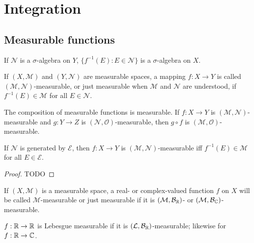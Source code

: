 \setchapterpreamble[u]{\margintoc}
\chapter{Integration}

\section{Measurable functions}

If $\mathcal{N}$ is a $\sigma$-algebra on $Y$, $\{ f^{-1}(E): E \in \mathcal{N} \}$ is a $\sigma$-algebra on $X$.

\begin{definition}
    If $(X, \mathcal{M})$ and $(Y, \mathcal{N})$ are measurable spaces, a mapping $f: X \to Y$ is called $(\mathcal{M}, \mathcal{N})$-measurable, or just measurable when $\mathcal{M}$ and $\mathcal{N}$ are understood, if $f^{-1}(E) \in \mathcal{M}$ for all $E \in \mathcal{N}$.
\end{definition}

The composition of measurable functions is measurable.
If $f: X \to Y$ is $(\mathcal{M}, \mathcal{N})$-measurable and $g: Y \to Z$ is $(\mathcal{N}, \mathcal{O})$-measurable, then $g \circ f$ is $(\mathcal{M}, \mathcal{O})$-measurable.

\begin{proposition}
    If $\mathcal{N}$ is generated by $\mathcal{E}$, then $f: X \to Y$ is $(\mathcal{M}, \mathcal{N})$-measurable iff $f^{-1}(E) \in \mathcal{M}$ for all $E \in \mathcal{E}$. 
\end{proposition}

\begin{proof}
    TODO
\end{proof}

\begin{definition}
    If  $(X, \mathcal{M})$ is a measurable space, a real- or complex-valued function $f$ on $X$ will be called $\mathcal{M}$-measurable or just measurable if it is $(\mathcal{M}, \mathcal{B}_{\mathbb{R}})$- or $(\mathcal{M}, \mathcal{B}_{\mathbb{C}})$-measurable.
\end{definition}

\begin{definition}
    $f: \mathbb{R} \to \mathbb{R}$ is Lebesgue measurable if it is $(\mathcal{L}, \mathcal{B}_{\mathbb{R}})$-measurable; likewise for $f:\mathbb{R} \to \mathbb{C}$.
\end{definition}

